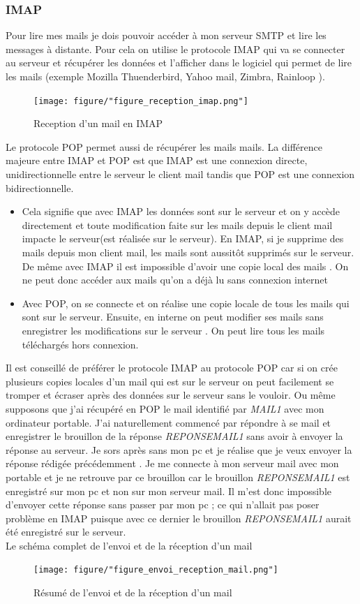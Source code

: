 \documentclass[a4paper,12pt,french]{report} %
\begin{document}
\subsubsection{ IMAP}
	Pour lire mes mails je dois pouvoir accéder à mon serveur SMTP et lire les messages à distante. Pour cela on utilise le protocole IMAP qui va se connecter au serveur et récupérer les données et l'afficher dans le logiciel qui permet de lire les mails (exemple Mozilla Thuenderbird, Yahoo mail, Zimbra, Rainloop ). 
\begin{figure}[H]
\centering
\texttt{[image: figure/"figure\_reception\_imap.png"]} 
\caption{Reception d'un mail en IMAP}
\label{Reception d'un mail en IMAP}
\end{figure}

Le protocole POP permet aussi de récupérer les mails mails. La différence majeure entre IMAP et POP est que IMAP est une connexion directe, unidirectionnelle  entre le serveur le client mail tandis que POP est une connexion bidirectionnelle.
\begin{itemize}
	\item Cela signifie que avec IMAP les données sont sur le serveur et on y accède directement et toute modification faite sur les mails depuis le client mail impacte le serveur(est réalisée sur le serveur). En IMAP, si je supprime des mails depuis mon client mail, les mails sont aussitôt supprimés sur le serveur. De même avec IMAP il est impossible d'avoir une copie local des mails . On ne peut donc accéder aux mails qu'on a déjà lu sans connexion internet
	\item Avec POP, on se connecte et on réalise une copie locale de tous les mails qui sont sur le serveur. Ensuite, en interne on peut modifier ses mails sans enregistrer les modifications sur le serveur . On peut lire tous les mails téléchargés hors connexion.  
\end{itemize} 
	Il est conseillé de préférer le protocole IMAP au protocole POP car si on crée plusieurs copies locales d'un mail qui est sur le serveur on peut facilement se tromper et écraser après des données sur le serveur sans le vouloir. Ou même supposons que j'ai récupéré en POP le mail identifié par \emph{MAIL1} avec mon ordinateur portable. J'ai naturellement commencé par répondre à se mail et enregistrer le brouillon de la réponse \emph{REPONSEMAIL1} sans avoir à envoyer la réponse au serveur. Je sors après sans mon pc et je réalise que je veux envoyer la réponse rédigée précédemment . Je me connecte à mon serveur mail avec mon portable et je ne retrouve par ce brouillon car le brouillon  \emph{REPONSEMAIL1} est enregistré sur mon pc et non sur mon serveur mail. Il m'est donc impossible d'envoyer cette réponse sans passer par mon pc ; ce qui n'allait  pas poser problème en IMAP puisque avec ce dernier le brouillon \emph{REPONSEMAIL1} aurait été enregistré sur le serveur. \\
	Le schéma complet de l'envoi et de la réception d'un mail 
\begin{figure}[H]
\centering
\texttt{[image: figure/"figure\_envoi\_reception\_mail.png"]} 
\caption{Résumé de l'envoi et de la réception d'un mail} \label{Résumé de l'envoi et de la reception d'un mai}
\end{figure}
\end{document}
